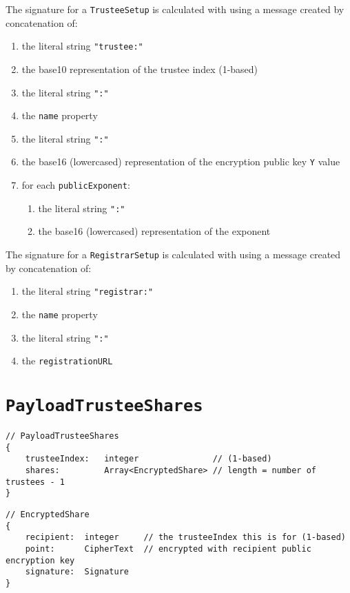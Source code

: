 The signature for a \texttt{TrusteeSetup} is calculated with using a message created by concatenation of:
\begin{enumerate}
    \item the literal string \lstinline[style=ES6]{"trustee:"}
    \item the base10 representation of the trustee index (1-based)
    \item the literal string \lstinline[style=ES6]{":"}
    \item the \texttt{name} property
    \item the literal string \lstinline[style=ES6]{":"}
    \item the base16 (lowercased) representation of the encryption public key \texttt{Y} value
    \item for each \texttt{publicExponent}:
          \begin{enumerate}
              \item the literal string \lstinline[style=ES6]{":"}
              \item the base16 (lowercased) representation of the exponent
          \end{enumerate}
\end{enumerate}

The signature for a \texttt{RegistrarSetup} is calculated with using a message created by concatenation of:

\begin{enumerate}
    \item the literal string \lstinline[style=ES6]{"registrar:"}
    \item the \texttt{name} property
    \item the literal string \lstinline[style=ES6]{":"}
    \item the \texttt{registrationURL}
\end{enumerate}

\section*{\texttt{PayloadTrusteeShares}}
\label{dt:payload:shares}
\begin{lstlisting}[style=ES6]
// PayloadTrusteeShares
{
    trusteeIndex:   integer               // (1-based)
    shares:         Array<EncryptedShare> // length = number of trustees - 1
}
\end{lstlisting}
\vspace*{-0.95em}
\label{dt:encshare}
\begin{lstlisting}[style=ES6, firstnumber=last]
// EncryptedShare
{
    recipient:  integer     // the trusteeIndex this is for (1-based)
    point:      CipherText  // encrypted with recipient public encryption key
    signature:  Signature
}
\end{lstlisting}

